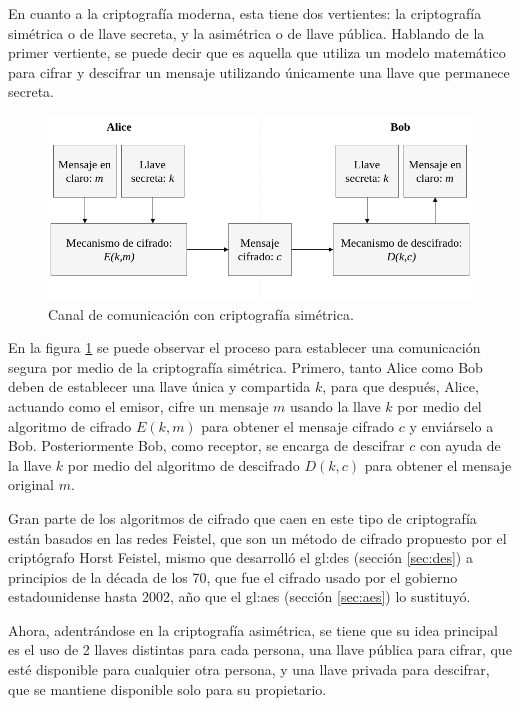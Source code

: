 En cuanto a la criptografía moderna, esta tiene dos vertientes: la
criptografía simétrica o de llave secreta, y la asimétrica o de llave
pública. Hablando de la primer vertiente, se puede decir que es aquella
que utiliza un modelo matemático para cifrar y descifrar un mensaje
utilizando únicamente una llave que permanece secreta.

\begin{figure}
  \begin{center}
    \includegraphics[width=0.8\linewidth]{diagramas/cripto_simetrica.png}
    \caption{Canal de comunicación con criptografía simétrica.}
    \label{cripto_simetrica}
  \end{center}
\end{figure}

En la figura \ref{cripto_simetrica} se puede observar el proceso para
establecer una comunicación segura por medio de la criptografía simétrica.
Primero, tanto Alice como Bob deben de establecer una llave única y
compartida $k$, para que después, Alice, actuando como el emisor, cifre un
mensaje $m$ usando la llave $k$ por medio del algoritmo de cifrado $E(k,m)$
para obtener el mensaje cifrado $c$ y enviárselo a Bob. Posteriormente Bob,
como receptor, se encarga de descifrar $c$ con ayuda de la llave $k$ por
medio del algoritmo de descifrado $D(k,c)$ para obtener el mensaje original
$m$.

Gran parte de los algoritmos de cifrado que caen en este tipo de criptografía
están basados en las redes Feistel, que son un método de cifrado propuesto
por el criptógrafo Horst Feistel, mismo que desarrolló el \gls{gl:des}
(sección \ref{sec:des}) a principios de la década de los 70, que fue el
cifrado usado por el gobierno estadounidense hasta 2002, año que el
\gls{gl:aes} (sección \ref{sec:aes}) lo sustituyó.

Ahora, adentrándose en la criptografía asimétrica, se tiene que su idea
principal es el uso de 2 llaves distintas para cada persona, una llave
pública para cifrar, que esté disponible para cualquier otra persona, y una
llave privada para descifrar, que se mantiene disponible solo para su
propietario.

